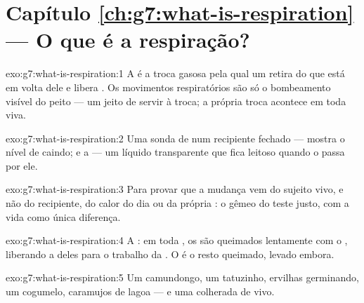 \section*{Capítulo \ref{ch:g7:what-is-respiration} --- O que é a respiração?}

\begin{solution}{exo:g7:what-is-respiration:1}
A  é a troca gasosa pela qual um  retira  do
que está em volta dele e libera . Os movimentos
respiratórios são só o bombeamento visível do peito --- um jeito de
servir à troca; a própria troca acontece em toda  viva.
\end{solution}

\begin{solution}{exo:g7:what-is-respiration:2}
Uma sonda de  num recipiente fechado --- mostra o nível de
 caindo; e a  --- um líquido transparente que fica
leitoso quando o  passa por ele.
\end{solution}

\begin{solution}{exo:g7:what-is-respiration:3}
Para provar que a mudança vem do sujeito vivo, e não do recipiente, do
calor do dia ou da própria : o gêmeo do teste justo, com a
vida como única diferença.
\end{solution}

\begin{solution}{exo:g7:what-is-respiration:4}
A : em toda , os  são queimados lentamente com
o , liberando a  deles para o trabalho da . O  é o resto queimado, levado embora.
\end{solution}

\begin{solution}{exo:g7:what-is-respiration:5}
Um camundongo, um tatuzinho, ervilhas germinando, um cogumelo,
caramujos de lagoa --- e uma colherada de  vivo.
\end{solution}

